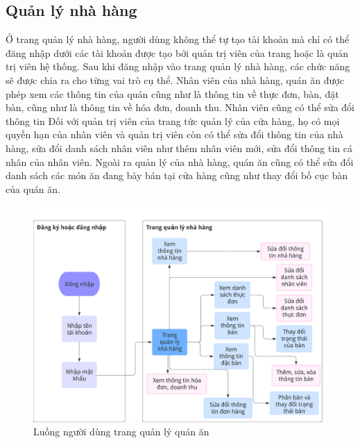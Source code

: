 \subsection{Quản lý nhà hàng}
Ở trang quản lý nhà hàng, người dùng không thể tự tạo tài khoản mà chỉ có thể đăng nhập dưới các tài khoản được tạo bởi quản trị viên của trang hoặc là quản trị viên hệ thống.
Sau khi đăng nhập vào trang quản lý nhà hàng, các chức năng sẽ được chia ra cho từng vai trò cụ thể.
Nhân viên của nhà hàng, quán ăn được phép xem các thông tin của quán cũng như là thông tin về thực đơn, bàn, đặt bàn, cũng như là thông tin về hóa đơn, doanh thu.
Nhân viên cũng có thể sửa đổi thông tin 
Đối với quản trị viên của trang tức quản lý của cửa hàng, họ có mọi quyền hạn của nhân viên và quản trị viên còn có thể sửa đổi thông tin của nhà hàng, sửa đổi danh sách nhân viên như thêm nhân viên mới, sửa đổi thông tin cá nhân của nhân viên. Ngoài ra quản lý của nhà hàng, quán ăn cũng có thể sửa đổi danh sách các món ăn đang bày bán tại cửa hàng cũng như thay đổi bố cục bàn của quán ăn.
\begin{figure}[H]
	\centering
	\includegraphics[width=\textwidth]{images/hChip/main-flow/admin-page-user-journey-flow.png}
	\caption{Luồng người dùng trang quản lý quán ăn }
	\label{fig:admin-page-user-journey}
\end{figure}